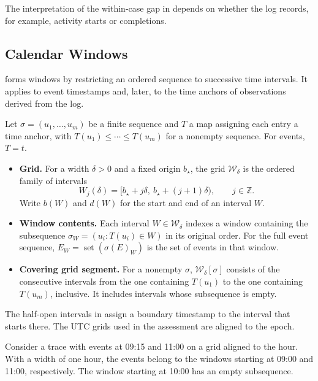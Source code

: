 The interpretation of the within-case gap in  depends on whether the log records, for example, activity starts or completions.

\subsection{Calendar Windows}

 forms windows by restricting an ordered sequence to successive time intervals. It applies to event timestamps and, later, to the time anchors of observations derived from the log.

\begin{Definition}\label{def:calendar-grid}
Let $\sigma=(u_1,\ldots,u_m)$ be a finite sequence and $T$ a map assigning each entry a time anchor, with $T(u_1)\leq\cdots\leq T(u_m)$ for a nonempty sequence. For events, $T=t$.
\begin{itemize}
  \item \textbf{Grid.} For a width $\delta>0$ and a fixed origin $b_\star$, the grid $\mathcal W_\delta$ is the ordered family of intervals
  \[
     W_j(\delta)=[b_\star+j\delta,\ b_\star+(j+1)\delta),
     \qquad j\in\mathbb Z.
  \]
  Write $b(W)$ and $d(W)$ for the start and end of an interval $W$.
  \item \textbf{Window contents.} Each interval $W\in\mathcal W_\delta$ indexes a window containing the subsequence $\sigma_W=(u_i:T(u_i)\in W)$ in its original order. For the full event sequence, $E_W=\operatorname{set}(\sigma(E)_W)$ is the set of events in that window.
  \item \textbf{Covering grid segment.} For a nonempty $\sigma$, $\mathcal W_\delta[\sigma]$ consists of the consecutive intervals from the one containing $T(u_1)$ to the one containing $T(u_m)$, inclusive. It includes intervals whose subsequence is empty.
\end{itemize}
\end{Definition}

The half-open intervals in  assign a boundary timestamp to the interval that starts there. The UTC grids used in the assessment are aligned to the epoch.

\begin{Example}\label{ex:window-boundary}
Consider a trace with events at 09:15 and 11:00 on a grid aligned to the hour. With a width of one hour, the events belong to the windows starting at 09:00 and 11:00, respectively. The window starting at 10:00 has an empty subsequence.
\end{Example}


